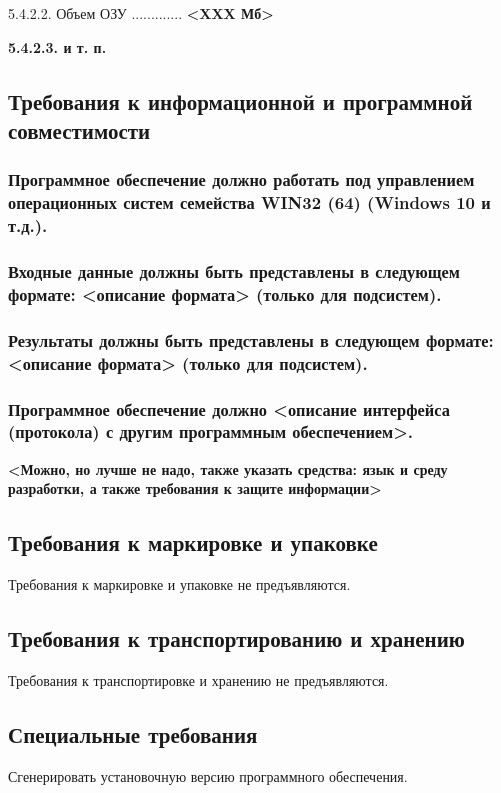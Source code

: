 \documentclass[12pt, left=30mm, right=15mm, top=20mm, bottom=20mm]{templateReportBMSTU}
\begin{document}
	5.4.2.2. Объем ОЗУ ............. \textbf{<XXX Мб>}

	\textbf{5.4.2.3. и т. п.}

	\subsection{Требования к информационной и программной совместимости}

	\subsubsection{Программное обеспечение должно работать под управлением операционных систем семейства \textbf{WIN32 (64) (Windows 10 и т.д.)}.}

	\subsubsection{\textbf{Входные данные должны быть представлены в следующем формате: <описание формата> (только для подсистем).}}

	\subsubsection{\textbf{Результаты должны быть представлены в следующем формате: <описание формата> (только для подсистем).}}
	
	\subsubsection{\textbf{Программное обеспечение должно <описание интерфейса (протокола) с другим программным обеспечением>.}}
	\textbf{<Можно, но лучше не надо, также указать средства: язык и среду разработки, а также требования к защите информации>}

	\subsection{Требования к маркировке и упаковке}
	Требования к маркировке и упаковке не предъявляются.
	
	\subsection{Требования к транспортированию и хранению}
	Требования к транспортировке и хранению не предъявляются.
	
	\subsection{Специальные требования}
	Сгенерировать установочную версию программного обеспечения.
\end{document}
